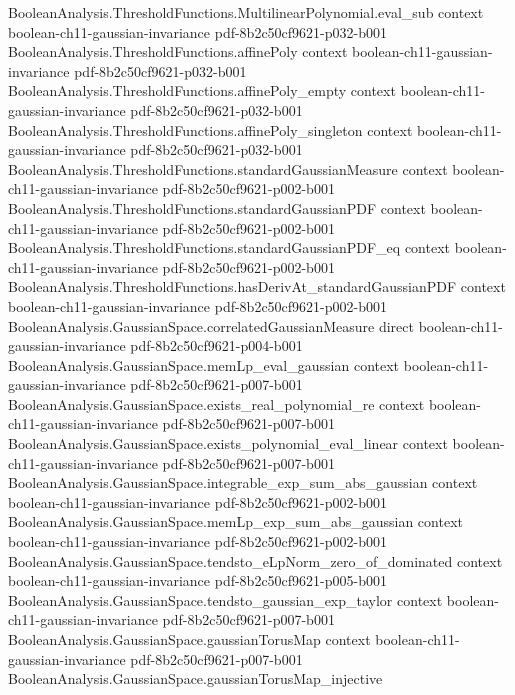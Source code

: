\begin{lemma}
\proofstep
  {BooleanAnalysis.ThresholdFunctions.MultilinearPolynomial.eval_sub}
  {context}
  {boolean-ch11-gaussian-invariance}
  {pdf-8b2c50cf9621-p032-b001}
\proofstep
  {BooleanAnalysis.ThresholdFunctions.affinePoly}
  {context}
  {boolean-ch11-gaussian-invariance}
  {pdf-8b2c50cf9621-p032-b001}
\proofstep
  {BooleanAnalysis.ThresholdFunctions.affinePoly_empty}
  {context}
  {boolean-ch11-gaussian-invariance}
  {pdf-8b2c50cf9621-p032-b001}
\proofstep
  {BooleanAnalysis.ThresholdFunctions.affinePoly_singleton}
  {context}
  {boolean-ch11-gaussian-invariance}
  {pdf-8b2c50cf9621-p032-b001}
\proofstep
  {BooleanAnalysis.ThresholdFunctions.standardGaussianMeasure}
  {context}
  {boolean-ch11-gaussian-invariance}
  {pdf-8b2c50cf9621-p002-b001}
\proofstep
  {BooleanAnalysis.ThresholdFunctions.standardGaussianPDF}
  {context}
  {boolean-ch11-gaussian-invariance}
  {pdf-8b2c50cf9621-p002-b001}
\proofstep
  {BooleanAnalysis.ThresholdFunctions.standardGaussianPDF_eq}
  {context}
  {boolean-ch11-gaussian-invariance}
  {pdf-8b2c50cf9621-p002-b001}
\proofstep
  {BooleanAnalysis.ThresholdFunctions.hasDerivAt_standardGaussianPDF}
  {context}
  {boolean-ch11-gaussian-invariance}
  {pdf-8b2c50cf9621-p002-b001}
\proofstep
  {BooleanAnalysis.GaussianSpace.correlatedGaussianMeasure}
  {direct}
  {boolean-ch11-gaussian-invariance}
  {pdf-8b2c50cf9621-p004-b001}
\proofstep
  {BooleanAnalysis.GaussianSpace.memLp_eval_gaussian}
  {context}
  {boolean-ch11-gaussian-invariance}
  {pdf-8b2c50cf9621-p007-b001}
\proofstep
  {BooleanAnalysis.GaussianSpace.exists_real_polynomial_re}
  {context}
  {boolean-ch11-gaussian-invariance}
  {pdf-8b2c50cf9621-p007-b001}
\proofstep
  {BooleanAnalysis.GaussianSpace.exists_polynomial_eval_linear}
  {context}
  {boolean-ch11-gaussian-invariance}
  {pdf-8b2c50cf9621-p007-b001}
\proofstep
  {BooleanAnalysis.GaussianSpace.integrable_exp_sum_abs_gaussian}
  {context}
  {boolean-ch11-gaussian-invariance}
  {pdf-8b2c50cf9621-p002-b001}
\proofstep
  {BooleanAnalysis.GaussianSpace.memLp_exp_sum_abs_gaussian}
  {context}
  {boolean-ch11-gaussian-invariance}
  {pdf-8b2c50cf9621-p002-b001}
\proofstep
  {BooleanAnalysis.GaussianSpace.tendsto_eLpNorm_zero_of_dominated}
  {context}
  {boolean-ch11-gaussian-invariance}
  {pdf-8b2c50cf9621-p005-b001}
\proofstep
  {BooleanAnalysis.GaussianSpace.tendsto_gaussian_exp_taylor}
  {context}
  {boolean-ch11-gaussian-invariance}
  {pdf-8b2c50cf9621-p007-b001}
\proofstep
  {BooleanAnalysis.GaussianSpace.gaussianTorusMap}
  {context}
  {boolean-ch11-gaussian-invariance}
  {pdf-8b2c50cf9621-p007-b001}
\proofstep
  {BooleanAnalysis.GaussianSpace.gaussianTorusMap_injective}

\end{lemma}
